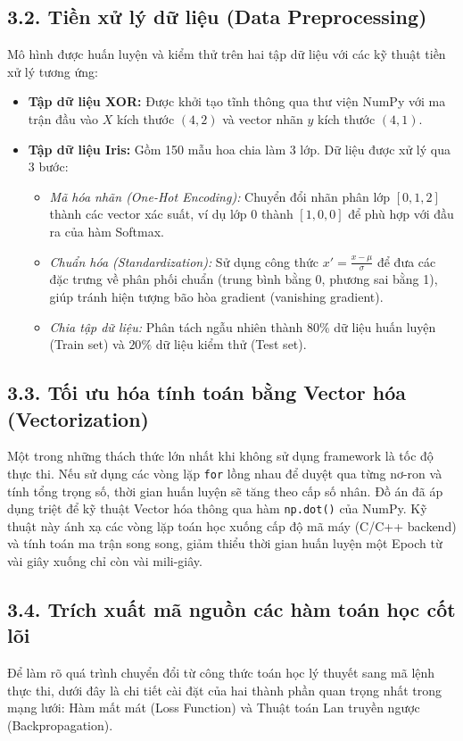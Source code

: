 \documentclass[13pt,a4paper]{article}
\begin{document}
\subsection*{3.2. Tiền xử lý dữ liệu (Data Preprocessing)}
Mô hình được huấn luyện và kiểm thử trên hai tập dữ liệu với các kỹ thuật tiền xử lý tương ứng:

\begin{itemize}
    \item \textbf{Tập dữ liệu XOR:} Được khởi tạo tĩnh thông qua thư viện NumPy với ma trận đầu vào $X$ kích thước $(4, 2)$ và vector nhãn $y$ kích thước $(4, 1)$.
    \item \textbf{Tập dữ liệu Iris:} Gồm 150 mẫu hoa chia làm 3 lớp. Dữ liệu được xử lý qua 3 bước:
    \begin{itemize}
        \item \textit{Mã hóa nhãn (One-Hot Encoding):} Chuyển đổi nhãn phân lớp $[0, 1, 2]$ thành các vector xác suất, ví dụ lớp 0 thành $[1, 0, 0]$ để phù hợp với đầu ra của hàm Softmax.
        \item \textit{Chuẩn hóa (Standardization):} Sử dụng công thức $x' = \frac{x - \mu}{\sigma}$ để đưa các đặc trưng về phân phối chuẩn (trung bình bằng 0, phương sai bằng 1), giúp tránh hiện tượng bão hòa gradient (vanishing gradient).
        \item \textit{Chia tập dữ liệu:} Phân tách ngẫu nhiên thành $80\%$ dữ liệu huấn luyện (Train set) và $20\%$ dữ liệu kiểm thử (Test set).
    \end{itemize}
\end{itemize}

\subsection*{3.3. Tối ưu hóa tính toán bằng Vector hóa (Vectorization)}
Một trong những thách thức lớn nhất khi không sử dụng framework là tốc độ thực thi. Nếu sử dụng các vòng lặp \texttt{for} lồng nhau để duyệt qua từng nơ-ron và tính tổng trọng số, thời gian huấn luyện sẽ tăng theo cấp số nhân. Đồ án đã áp dụng triệt để kỹ thuật Vector hóa thông qua hàm \texttt{np.dot()} của NumPy. Kỹ thuật này ánh xạ các vòng lặp toán học xuống cấp độ mã máy (C/C++ backend) và tính toán ma trận song song, giảm thiểu thời gian huấn luyện một Epoch từ vài giây xuống chỉ còn vài mili-giây.
\subsection*{3.4. Trích xuất mã nguồn các hàm toán học cốt lõi}
Để làm rõ quá trình chuyển đổi từ công thức toán học lý thuyết sang mã lệnh thực thi, dưới đây là chi tiết cài đặt của hai thành phần quan trọng nhất trong mạng lưới: Hàm mất mát (Loss Function) và Thuật toán Lan truyền ngược (Backpropagation).
\end{document}
